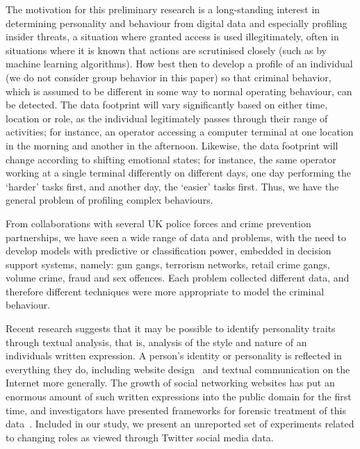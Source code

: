 \documentclass{llncs}
\begin{document}
The motivation for this preliminary research is a long-standing
interest in determining personality and behaviour from digital data
and especially profiling insider threats, a situation where granted
access is used illegitimately, often in situations where it is known
that actions are scrutinised closely (such as by machine learning
algorithms). How best then to develop a profile of an individual (we
do not consider group behavior in this paper) so that criminal
behavior, which is assumed to be different in some way to normal
operating behaviour, can be detected. The data footprint will vary
significantly based on either time, location or role, as the
individual legitimately passes through their range of activities; for
instance, an operator accessing a computer terminal at one location in
the morning and another in the afternoon. Likewise, the data footprint
will change according to shifting emotional states; for instance, the
same operator working at a single terminal differently on different
days, one day performing the `harder' tasks first, and another day,
the `easier' tasks first. Thus, we have the general problem of
profiling complex behaviours.

From collaborations with several UK police forces and crime prevention
partnerships, we have seen a wide range of data and problems, with the
need to develop models with predictive or classification power,
embedded in decision support systems, namely: gun gangs, terrorism
networks, retail crime gangs, volume crime, fraud and sex offences.
Each problem collected different data, and therefore different
techniques were more appropriate to model the criminal behaviour.

Recent research suggests that it may be possible to identify
personality traits through textual analysis, that is, analysis of the
style and nature of an individuals written expression. A person's
identity or personality is reflected in everything they do, including
website design~\cite{vazire+gosling:2004} and textual communication on
the Internet more generally. The growth of social networking websites
has put an enormous amount of such written expressions into the public
domain for the first time, and investigators have presented frameworks
for forensic treatment of this data~\cite{haggerty-et-al:2012}.
Included in our study, we present an unreported set of experiments
related to changing roles as viewed through Twitter social media data.
\end{document}
